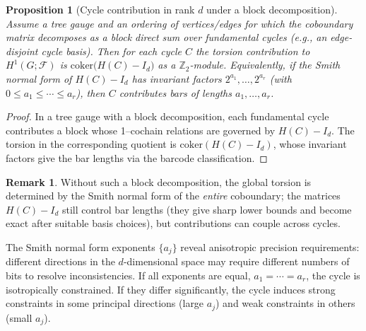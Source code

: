 \documentclass[11pt]{amsart}
\theoremstyle{plain}
\newtheorem{proposition}[theorem]{Proposition}
\theoremstyle{definition}
\newtheorem{remark}[theorem]{Remark}
\newcommand{\sheaf}[1]{\mathcal{#1}}                  %
\begin{document}
\begin{proposition}[Cycle contribution in rank $d$ under a block decomposition]
\label{prop:matrix-cycle}
Assume a tree gauge and an ordering of vertices/edges for which the coboundary matrix decomposes as a block direct sum over fundamental cycles (e.g., an edge-disjoint cycle basis). Then for each cycle $C$ the torsion contribution to $H^1(G;\sheaf{F})$ is $\mathrm{coker}\!\big(H(C)-I_d\big)$ as a $\mathbb{Z}_2$-module. Equivalently, if the Smith normal form of $H(C)-I_d$ has invariant factors $2^{a_1}, \ldots, 2^{a_r}$ (with $0\le a_1\le\cdots\le a_r$), then $C$ contributes bars of lengths $a_1, \ldots, a_r$.
\end{proposition}

\begin{proof}
In a tree gauge with a block decomposition, each fundamental cycle contributes a block whose 1–cochain relations are governed by $H(C)-I_d$. The torsion in the corresponding quotient is $\mathrm{coker}(H(C)-I_d)$, whose invariant factors give the bar lengths via the barcode classification.
\end{proof}

\begin{remark}
Without such a block decomposition, the global torsion is determined by the Smith normal form of the \emph{entire} coboundary; the matrices $H(C)-I_d$ still control bar lengths (they give sharp lower bounds and become exact after suitable basis choices), but contributions can couple across cycles.
\end{remark}

The Smith normal form exponents $\{a_j\}$ reveal anisotropic precision requirements: different directions in the $d$-dimensional space may require different numbers of bits to resolve inconsistencies. If all exponents are equal, $a_1 = \cdots = a_r$, the cycle is isotropically constrained. If they differ significantly, the cycle induces strong constraints in some principal directions (large $a_j$) and weak constraints in others (small $a_j$).
\end{document}
